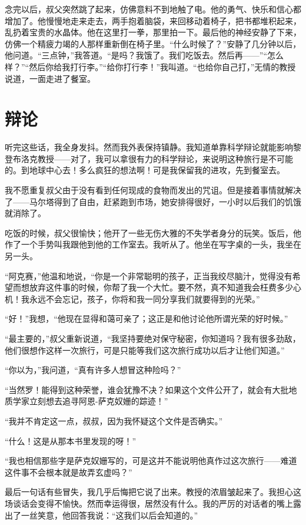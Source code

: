 \documentclass[10pt]{book}
\begin{document}
念完以后，叔父突然跳了起来，仿佛意料不到地触了电。他的勇气、快乐和信心都增加了。他慢慢地走来走去，两手抱着脑袋，来回移动着椅子，把书都堆积起来，乱扔着宝贵的水晶体。他在这里打一拳，那里拍一下。最后他的神经安静了下来，仿佛一个精疲力竭的人那样重新倒在椅子里。“什么时候了？”安静了几分钟以后，他问道。“三点钟，”我答道。“是吗？我饿了。我们吃饭去。然后再——”“怎么样？”“然后你给我打行李。”“给你打行李！”我叫道。“也给你自己打，”无情的教授说道，一面走进了餐室。

\chapter{辩论}
听完这些话，我全身发抖。然而我外表保持镇静。我知道单靠科学辩论就能影响黎登布洛克教授——对了，我可以拿很有力的科学辩论，来说明这种旅行是不可能的。到地球中心去！多么疯狂的想法啊！可是我保留我的进攻，先到餐室去。

我不愿重复叔父由于没有看到任何现成的食物而发出的咒诅。但是接着事情就解决了——马尔塔得到了自由，赶紧跑到市场，她安排得很好，一小时以后我们的饥饿就消除了。

吃饭的时候，叔父很愉快；他开了一些无伤大雅的不失学者身分的玩笑。饭后，他作了一个手势叫我跟他到他的工作室去。我听从了。他坐在写字桌的一头，我坐在另一头。

“阿克赛，”他温和地说，“你是一个非常聪明的孩子，正当我绞尽脑汁，觉得没有希望而想放弃这件事的时候，你帮了我一个大忙。要不然，真不知道我会枉费多少心机！我永远不会忘记，孩子，你将和我一同分享我们就要得到的光荣。”

“好！”我想，“他现在显得和蔼可亲了；这正是和他讨论他所谓光荣的好时候。”

“最主要的，”叔父重新说道，“我坚持要绝对保守秘密，你知道吗？我有很多劲敌，他们很想作这样一次旅行，可是只能等我们这次旅行成功以后才让他们知道。”

“你以为，”我问道，“真有许多人想冒这种险吗？”

“当然罗！能得到这种荣誉，谁会犹豫不决？如果这个文件公开了，就会有大批地质学家立刻想去追寻阿恩-萨克奴姗的踪迹！”

“我并不肯定这一点，叔叔，因为我怀疑这个文件是否确实。”

“什么！这是从那本书里发现的呀！”

“我也相信那些字是萨克奴姗写的，可是这并不能说明他真作过这次旅行——难道这件事不会根本就是故弄玄虚吗？”

最后一句话有些冒失，我几乎后悔把它说了出来。教授的浓眉皱起来了。我担心这场谈话会变得不愉快。然而幸运得很，居然没有什么。我的严厉的对话者的嘴上露出了一丝笑意，他回答我说：“这我们以后会知道的。”
\end{document}
